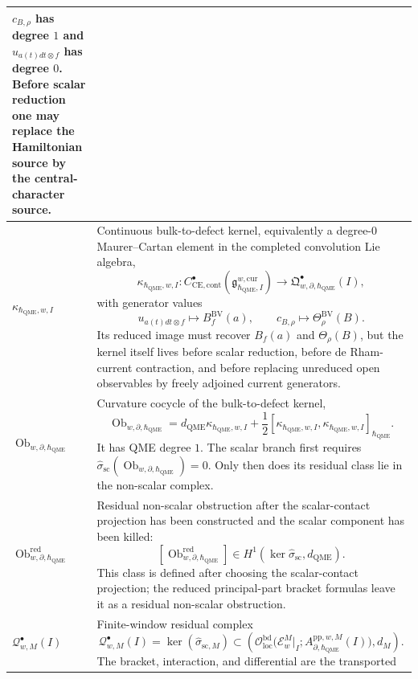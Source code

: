 \begin{longtable}{@{}>{\raggedright\arraybackslash}p{}
  >{\raggedright\arraybackslash}p{}@{}}
\(c_{B,\rho}\) has degree \(1\) and
\(u_{a(t)dt\otimes f}\) has degree \(0\).  Before scalar reduction one
may replace the Hamiltonian source by the central-character source.\\
\hline
\(\kappa_{\hbar_{\mathrm{QME}},w,I}\) &
Continuous bulk-to-defect kernel, equivalently a degree-\(0\)
Maurer--Cartan element in the completed convolution Lie algebra,
\[
  \kappa_{\hbar_{\mathrm{QME}},w,I}\colon
  C^\bullet_{\mathrm{CE},\mathrm{cont}}
  (\mathfrak g^{w,\mathrm{cur}}_{\hbar_{\mathrm{QME}},I})
  \longrightarrow
  \mathfrak Q^\bullet_{w,\partial,\hbar_{\mathrm{QME}}}(I),
\]
with generator values
\[
  u_{a(t)dt\otimes f}\mapsto B_f^{\mathrm{BV}}(a),
  \qquad
  c_{B,\rho}\mapsto\Theta_\rho^{\mathrm{BV}}(B).
\]
Its reduced image must recover \(B_f(a)\) and \(\Theta_\rho(B)\), but the
kernel itself lives before scalar reduction, before de Rham-current
contraction, and before replacing unreduced open observables by freely
adjoined current generators.\\
\hline
\(\operatorname{Ob}_{w,\partial,\hbar_{\mathrm{QME}}}\) &
Curvature cocycle of the bulk-to-defect kernel,
\[
  \operatorname{Ob}_{w,\partial,\hbar_{\mathrm{QME}}}
    =
  d_{\mathrm{QME}}\kappa_{\hbar_{\mathrm{QME}},w,I}
  +\frac12[\kappa_{\hbar_{\mathrm{QME}},w,I},
  \kappa_{\hbar_{\mathrm{QME}},w,I}]_{\hbar_{\mathrm{QME}}} .
\]
It has QME degree \(1\).  The scalar branch first requires
\(\widehat\sigma_{\mathrm{sc}}(\operatorname{Ob}_{w,\partial,\hbar_{\mathrm{QME}}})=0\).
Only then does its residual class lie in the non-scalar complex.\\
\hline
\(\operatorname{Ob}^{\mathrm{red}}_{w,\partial,\hbar_{\mathrm{QME}}}\) &
Residual non-scalar obstruction after the scalar-contact projection has
been constructed and the scalar component has been killed:
\[
  [\operatorname{Ob}^{\mathrm{red}}_{w,\partial,\hbar_{\mathrm{QME}}}]
  \in
  H^1\!\left(
    \ker\widehat\sigma_{\mathrm{sc}},
    d_{\mathrm{QME}}
  \right).
\]
This class is defined after choosing the scalar-contact projection; the
reduced principal-part bracket formulas leave it as a residual
non-scalar obstruction.\\
\hline
\(\mathcal Q^\bullet_{w,M}(I)\) &
Finite-window residual complex
\[
  \mathcal Q^\bullet_{w,M}(I)
    =
  \ker(\widehat\sigma_{\mathrm{sc},M})
  \subset
  \left(
    \mathcal O_{\mathrm{loc}}^{\mathrm{bd}}\bigl(
      \mathcal E_w^M|_I;
      A_{\partial,\hbar_{\mathrm{QME}}}^{\mathrm{pp},w,M}(I)\bigr),
    d_M
  \right).
\]
The bracket, interaction, and differential are the transported

\end{longtable}
